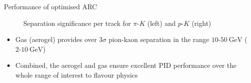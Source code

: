 \documentclass{beamer}
\begin{document}
\begin{frame}{Performance of optimised ARC}
\begin{figure}
\begin{subfigure}{0.5\textwidth}
    \end{subfigure}
    \vspace{-0.4cm}
    \caption{Separation significance per track for $\pi$-$K$ (left) and $p$-$K$ (right)}
  \end{figure}
  \vspace{-0.4cm}
  \begin{itemize}
    \setlength\itemsep{0.0em}
    \item{Gas (aerogel) provides over $3\sigma$ pion-kaon separation in the range $10$-$\SI{50}{\giga\eV}$ ($2$-$\SI{10}{\giga\eV}$)}
    \item{Combined, the aerogel and gas ensure excellent PID performance over the whole range of interest to flavour physics}
  \end{itemize}
\end{frame}
\end{document}
